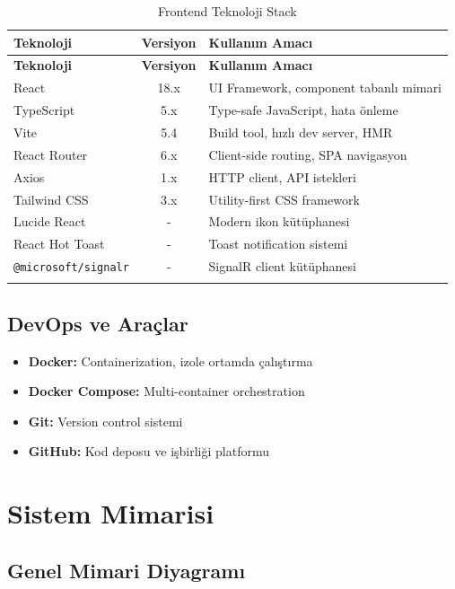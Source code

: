 \documentclass[12pt,a4paper]{article}
\begin{document}
\begin{longtable}{|l|c|p{7cm}|}
\hline
\textbf{Teknoloji} & \textbf{Versiyon} & \textbf{Kullanım Amacı} \\
\hline
\endfirsthead
\hline
\textbf{Teknoloji} & \textbf{Versiyon} & \textbf{Kullanım Amacı} \\
\hline
\endhead
React & 18.x & UI Framework, component tabanlı mimari \\
\hline
TypeScript & 5.x & Type-safe JavaScript, hata önleme \\
\hline
Vite & 5.4 & Build tool, hızlı dev server, HMR \\
\hline
React Router & 6.x & Client-side routing, SPA navigasyon \\
\hline
Axios & 1.x & HTTP client, API istekleri \\
\hline
Tailwind CSS & 3.x & Utility-first CSS framework \\
\hline
Lucide React & - & Modern ikon kütüphanesi \\
\hline
React Hot Toast & - & Toast notification sistemi \\
\hline
\verb|@microsoft/signalr| & - & SignalR client kütüphanesi \\
\hline
\caption{Frontend Teknoloji Stack}
\end{longtable}

\subsection{DevOps ve Araçlar}

\begin{itemize}
    \item \textbf{Docker:} Containerization, izole ortamda çalıştırma
    \item \textbf{Docker Compose:} Multi-container orchestration
    \item \textbf{Git:} Version control sistemi
    \item \textbf{GitHub:} Kod deposu ve işbirliği platformu
\end{itemize}

\newpage

\section{Sistem Mimarisi}

\subsection{Genel Mimari Diyagramı}
\end{document}
